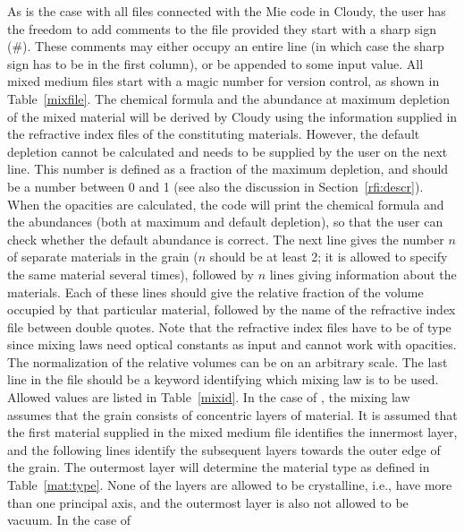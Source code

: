 As is the case with all files connected with the Mie code in Cloudy, the user
has the freedom to add comments to the file provided they start with a sharp
sign (\#). These comments may either occupy an entire line (in which case the
sharp sign has to be in the first column), or be appended to some input value.
All mixed medium files start with a magic number for version control, as shown
in Table~\ref{mixfile}.
The chemical formula and the abundance at maximum depletion of the mixed
material will be derived by Cloudy using the information supplied in the
refractive index files of the constituting materials. However, the default
depletion cannot be calculated and needs to be supplied by the user on the
next line. This number is defined as a fraction of the maximum depletion, and
should be a number between 0 and 1 (see also the discussion in
Section~\ref{rfi:descr}). When the opacities are calculated, the code will
print the chemical formula and the abundances (both at maximum and default
depletion), so that the user can check whether the default abundance is
correct. The next line gives the number $n$ of separate materials in the grain
($n$ should be at least 2; it is allowed to specify the same material several
times), followed by $n$ lines giving information about the materials. Each of
these lines should give the relative fraction of the volume occupied by that
particular material, followed by the name of the refractive index file between
double quotes. Note that the refractive index files have to be of type
 since mixing laws need optical constants as input and
cannot work with opacities. The normalization of the relative volumes can be
on an arbitrary scale. The last line in the file should be a keyword
identifying which mixing law is to be used. Allowed values are listed in
Table~\ref{mixid}. In the case of \citet{Farafonov2000}, the mixing law
assumes that the grain consists of concentric layers of material. It is
assumed that the first material supplied in the mixed medium file identifies
the innermost layer, and the following lines identify the subsequent layers
towards the outer edge of the grain. The outermost layer will determine the
material type as defined in Table~\ref{mat:type}. None of the layers are
allowed to be crystalline, i.e., have more than one principal axis, and the
outermost layer is also not allowed to be vacuum. In the case of
